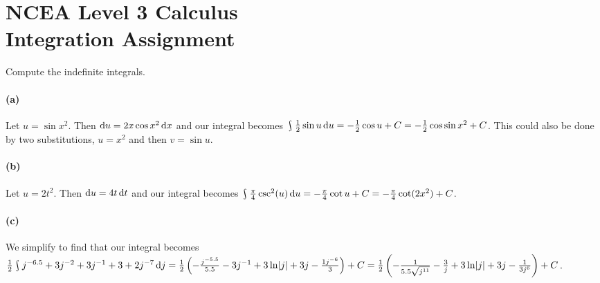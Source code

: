 \documentclass[answers]{exam}
\theoremstyle{definition}
\theoremstyle{break}
\DeclareMathOperator*{\rint}{\scalerel*{\rotatebox{17}{$\!\int\!$}}{\int}}
\begin{document}
\section*{NCEA Level 3 Calculus\\Integration Assignment}
\begin{questions}
  \question Compute the indefinite integrals.
  \begin{solution}
    \paragraph{(a)} Let $ u = \sin x^2 $. Then $ \dif{u} = 2x \cos x^2 \dif{x} $ and our integral
    becomes $ \rint \frac{1}{2} \sin u \dif{u} = -\frac{1}{2} \cos u + C = -\frac{1}{2} \cos \sin x^2 + C $. This
    could also be done by two substitutions, $ u = x^2 $ and then $ v = \sin u $.
    \paragraph{(b)} Let $ u = 2t^2 $. Then $ \dif{u} = 4t \dif{t} $ and our integral becomes $ \rint \frac{\pi}{4} \csc^2(u) \dif{u}
    = -\frac{\pi}{4} \cot u + C = -\frac{\pi}{4} \cot (2x^2) + C $.
    \paragraph{(c)} We simplify to find that our integral becomes $ \frac{1}{2} \rint j^{-6.5} + 3j^{-2} + 3j^{-1} + 3 + 2j^{-7} \dif{j}
    = \frac{1}{2} \left( -\frac{j^{-5.5}}{5.5} - 3j^{-1} + 3\ln\abs{j} + 3j - \frac{1j^{-6}}{3} \right) + C
    = \frac{1}{2} \left( -\frac{1}{5.5\sqrt{j^{11}}} - \frac{3}{j} + 3\ln\abs{j} + 3j - \frac{1}{3j^6} \right) + C $.

\end{solution}
\end{questions}
\end{document}
